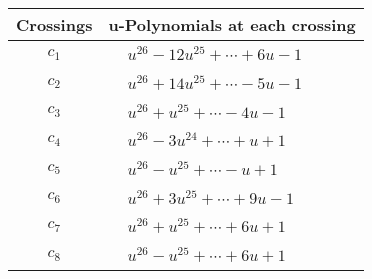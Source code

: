 \documentclass[1p]{elsarticle_modified}
\theoremstyle{definition}
\begin{document}
\begin{tabular}{m{50pt}|m{274pt}}
Crossings & \hspace{64pt}u-Polynomials at each crossing \\
\hline $$\begin{aligned}c_{1}\end{aligned}$$&$\begin{aligned}
&u^{26}-12 u^{25}+\cdots+6 u-1
\end{aligned}$\\
\hline $$\begin{aligned}c_{2}\end{aligned}$$&$\begin{aligned}
&u^{26}+14 u^{25}+\cdots-5 u-1
\end{aligned}$\\
\hline $$\begin{aligned}c_{3}\end{aligned}$$&$\begin{aligned}
&u^{26}+u^{25}+\cdots-4 u-1
\end{aligned}$\\
\hline $$\begin{aligned}c_{4}\end{aligned}$$&$\begin{aligned}
&u^{26}-3 u^{24}+\cdots+u+1
\end{aligned}$\\
\hline $$\begin{aligned}c_{5}\end{aligned}$$&$\begin{aligned}
&u^{26}- u^{25}+\cdots- u+1
\end{aligned}$\\
\hline $$\begin{aligned}c_{6}\end{aligned}$$&$\begin{aligned}
&u^{26}+3 u^{25}+\cdots+9 u-1
\end{aligned}$\\
\hline $$\begin{aligned}c_{7}\end{aligned}$$&$\begin{aligned}
&u^{26}+u^{25}+\cdots+6 u+1
\end{aligned}$\\
\hline $$\begin{aligned}c_{8}\end{aligned}$$&$\begin{aligned}
&u^{26}- u^{25}+\cdots+6 u+1
\end{aligned}$\\

\end{tabular}
\end{document}
